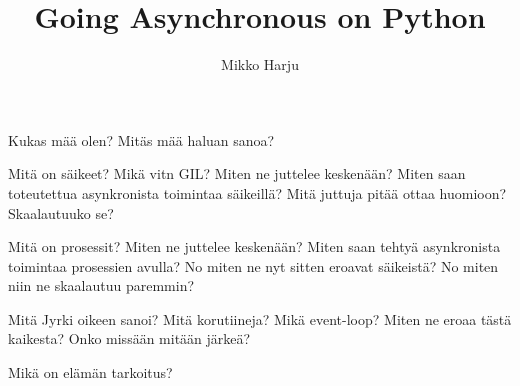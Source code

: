 \documentclass{beamer}
\title{Going Asynchronous on Python}
\author{Mikko Harju}
\institute{Taiste}
\begin{document}
\begin{frame}
\titlepage
\end{frame}

\begin{frame}
    Kukas mää olen?
    Mitäs mää haluan sanoa?

    Mitä on säikeet?
    Mikä vitn GIL?
    Miten ne juttelee keskenään?
    Miten saan toteutettua asynkronista toimintaa säikeillä?
    Mitä juttuja pitää ottaa huomioon?
    Skaalautuuko se?

    Mitä on prosessit?
    Miten ne juttelee keskenään?
    Miten saan tehtyä asynkronista toimintaa prosessien avulla?
    No miten ne nyt sitten eroavat säikeistä?
    No miten niin ne skaalautuu paremmin?

    Mitä Jyrki oikeen sanoi?  Mitä korutiineja?  Mikä event-loop? 
    Miten ne eroaa tästä kaikesta? Onko missään mitään järkeä?
    
    Mikä on elämän tarkoitus?
\end{frame}
\end{document}
